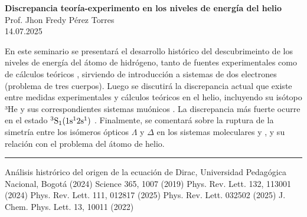 \documentclass[a4paper,12pt]{article}
\begin{document}
\begin{center}
	{\bf Discrepancia teoría-experimento en los niveles de energía del helio} \\
	Prof. Jhon Fredy Pérez Torres \\
	14.07.2025
\end{center}

	En este seminario se presentará el desarrollo histórico del 
	descubrimeinto de los niveles de energ\'ia del átomo de hidrógeno,
	tanto de fuentes experimentales como de cálculos teóricos
	\cite{Duarte2024,Bezginov2019,Scheidegger2024},
	sirviendo de introducción a sistemas de dos electrones (problema de tres cuerpos).
	Luego se discutirá la discrepancia actual que existe entre medidas
	experimentales y cálculos teóricos en el helio, incluyendo su isótopo
	³He y sus correspondientes sistemas muónicos \cite{Clausen2025,Muli2025}.
	La discrepancia m\'as fuerte ocurre en el estado $\rm {^3S_1}(1s^12s^1)$ \cite{Clausen2025}.
	Finalmente, se comentar\'a sobre la ruptura de la simetr\'ia entre los is\'omeros
	\'opticos $\Lambda$ y $\Delta$ en los sistemas moleculares 
	y  \cite{RuAcac3}, y su relaci\'on con el problema del \'atomo de helio.

\vspace{1cm}\hrule
\begin{thebibliography}{9}
	\footnotesize
	 Análisis histrórico del origen de la ecuación de Dirac,
		Universidad Pedagógica Nacional, Bogotá (2024)
	 Science 365, 1007 (2019)
	 Phys. Rev. Lett. 132, 113001 (2024)
	 Phys. Rev. Lett. 111, 012817 (2025)
	 Phys. Rev. Lett. 032502 (2025)
	 J. Chem. Phys. Lett. 13, 10011 (2022)
\end{thebibliography}
\end{document}
